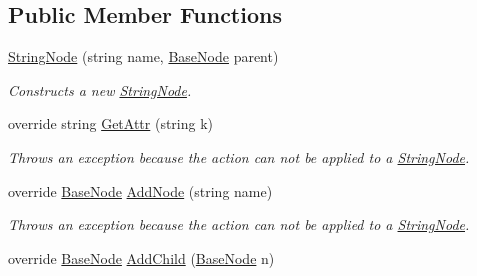 \subsection*{Public Member Functions}
\begin{DoxyCompactItemize}
\item 
\hyperlink{class_x_m_leru_handleru_1_1_string_node_a4c1eafc0ac995e89ef5a4af85c0f9c19}{String\+Node} (string name, \hyperlink{class_x_m_leru_handleru_1_1_base_node}{Base\+Node} parent)
\begin{DoxyCompactList}\small\item\em Constructs a new \hyperlink{class_x_m_leru_handleru_1_1_string_node}{String\+Node}. \end{DoxyCompactList}\item 
\hypertarget{class_x_m_leru_handleru_1_1_string_node_a9295646821e8135839f7e731b750e494}{}override string \hyperlink{class_x_m_leru_handleru_1_1_string_node_a9295646821e8135839f7e731b750e494}{Get\+Attr} (string k)\label{class_x_m_leru_handleru_1_1_string_node_a9295646821e8135839f7e731b750e494}

\begin{DoxyCompactList}\small\item\em Throws an exception because the action can not be applied to a \hyperlink{class_x_m_leru_handleru_1_1_string_node}{String\+Node}. \end{DoxyCompactList}\item 
\hypertarget{class_x_m_leru_handleru_1_1_string_node_a577acb87d6791fc9aeacaf9e8e6effcb}{}override \hyperlink{class_x_m_leru_handleru_1_1_base_node}{Base\+Node} \hyperlink{class_x_m_leru_handleru_1_1_string_node_a577acb87d6791fc9aeacaf9e8e6effcb}{Add\+Node} (string name)\label{class_x_m_leru_handleru_1_1_string_node_a577acb87d6791fc9aeacaf9e8e6effcb}

\begin{DoxyCompactList}\small\item\em Throws an exception because the action can not be applied to a \hyperlink{class_x_m_leru_handleru_1_1_string_node}{String\+Node}. \end{DoxyCompactList}\item 
\hypertarget{class_x_m_leru_handleru_1_1_string_node_a4e5019cd4fa98a233d1d1d580a861dc4}{}override \hyperlink{class_x_m_leru_handleru_1_1_base_node}{Base\+Node} \hyperlink{class_x_m_leru_handleru_1_1_string_node_a4e5019cd4fa98a233d1d1d580a861dc4}{Add\+Child} (\hyperlink{class_x_m_leru_handleru_1_1_base_node}{Base\+Node} n)\label{class_x_m_leru_handleru_1_1_string_node_a4e5019cd4fa98a233d1d1d580a861dc4}


\end{DoxyCompactItemize}
